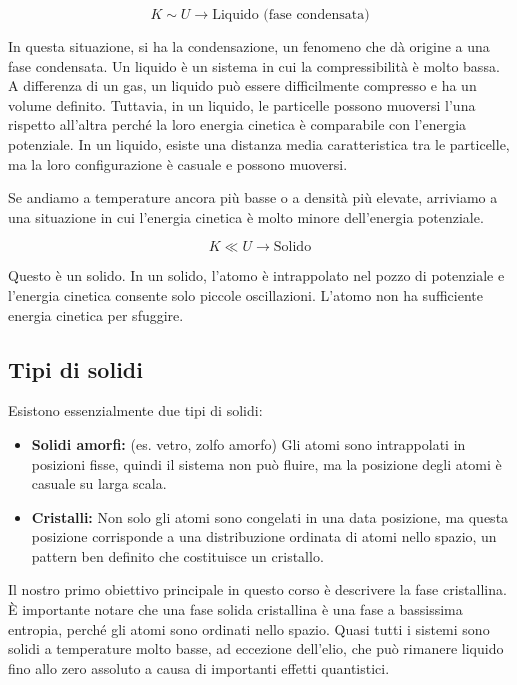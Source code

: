 \begin{equation}
 K \sim U \rightarrow \text{Liquido (fase condensata)}
\end{equation}

In questa situazione, si ha la condensazione, un fenomeno che dà origine a una fase condensata. Un liquido è un sistema in cui la compressibilità è molto bassa. A differenza di un gas, un liquido può essere difficilmente compresso e ha un volume definito. Tuttavia, in un liquido, le particelle possono muoversi l'una rispetto all'altra perché la loro energia cinetica è comparabile con l'energia potenziale. In un liquido, esiste una distanza media caratteristica tra le particelle, ma la loro configurazione è casuale e possono muoversi.

Se andiamo a temperature ancora più basse o a densità più elevate, arriviamo a una situazione in cui l'energia cinetica è molto minore dell'energia potenziale.

\begin{equation}
 K \ll U \rightarrow \text{Solido}
\end{equation}

Questo è un solido. In un solido, l'atomo è intrappolato nel pozzo di potenziale e l'energia cinetica consente solo piccole oscillazioni. L'atomo non ha sufficiente energia cinetica per sfuggire.

\subsection{Tipi di solidi}

Esistono essenzialmente due tipi di solidi:
\begin{itemize}
    \item \textbf{Solidi amorfi:} (es. vetro, zolfo amorfo) Gli atomi sono intrappolati in posizioni fisse, quindi il sistema non può fluire, ma la posizione degli atomi è casuale su larga scala.
    \item \textbf{Cristalli:} Non solo gli atomi sono congelati in una data posizione, ma questa posizione corrisponde a una distribuzione ordinata di atomi nello spazio, un pattern ben definito che costituisce un cristallo.
\end{itemize}

Il nostro primo obiettivo principale in questo corso è descrivere la fase cristallina. È importante notare che una fase solida cristallina è una fase a bassissima entropia, perché gli atomi sono ordinati nello spazio. Quasi tutti i sistemi sono solidi a temperature molto basse, ad eccezione dell'elio, che può rimanere liquido fino allo zero assoluto a causa di importanti effetti quantistici.

